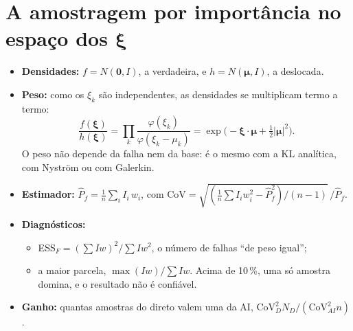 \documentclass[11pt,a4paper]{article}
\begin{document}
\section{A amostragem por importância no espaço dos \texorpdfstring{$\bm\xi$}{xi}}
\begin{itemize}
  \item \textbf{Densidades:} $f = N(\bm 0, I)$, a verdadeira, e $h = N(\bm\mu, I)$, a deslocada.
  \item \textbf{Peso:} como os $\xi_k$ são independentes, as densidades se multiplicam termo a termo:
    \[
      \frac{f(\bm\xi)}{h(\bm\xi)} = \prod_{k} \frac{\varphi(\xi_k)}{\varphi(\xi_k - \mu_k)}
      = \exp\!\Big(-\bm\xi\cdot\bm\mu + \tfrac12 |\bm\mu|^2\Big).
    \]
    O peso não depende da falha nem da base: é o mesmo com a KL analítica, com Nyström ou com Galerkin.
  \item \textbf{Estimador:} $\hat P_f = \frac1n \sum_i I_i\, w_i$, com
    $\mathrm{CoV} = \sqrt{(\frac1n\sum I_i w_i^2 - \hat P_f^2)/(n-1)}\,/\hat P_f$.
  \item \textbf{Diagnósticos:}
    \begin{itemize}
      \item ESS$_F = (\sum I w)^2/\sum I w^2$, o número de falhas ``de peso igual'';
      \item a maior parcela, $\max(I w)/\sum I w$. Acima de 10\,\%, uma só amostra domina, e o resultado não é confiável.
    \end{itemize}
  \item \textbf{Ganho:} quantas amostras do direto valem uma da AI, $\mathrm{CoV}_D^2 N_D / (\mathrm{CoV}_{AI}^2 n)$.
\end{itemize}
\end{document}
